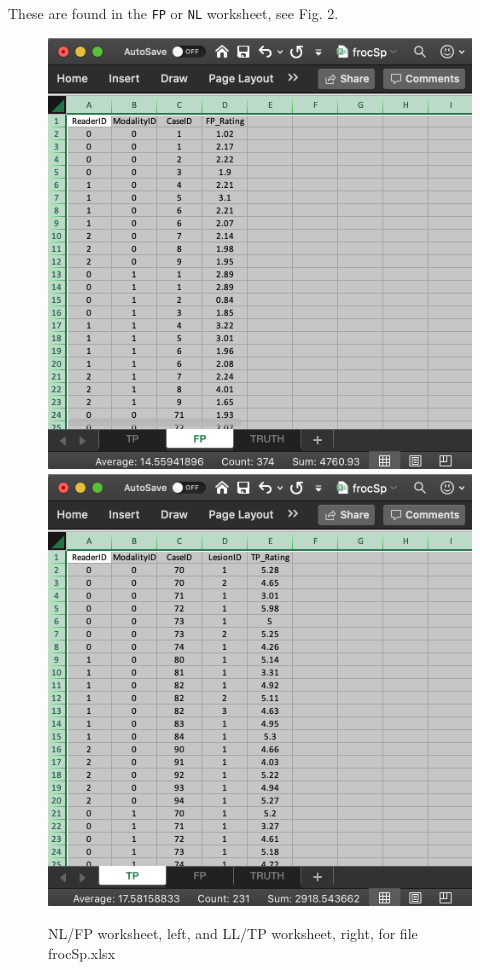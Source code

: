 \documentclass[]{book}
\begin{document}
These are found in the \texttt{FP} or \texttt{NL} worksheet, see Fig. 2.

\begin{figure}

{\centering \includegraphics[width=0.5\linewidth,height=0.2\textheight]{images/frocSpNL} \includegraphics[width=0.5\linewidth,height=0.2\textheight]{images/frocSpLL} 

}

\caption{NL/FP worksheet, left, and LL/TP worksheet, right, for file frocSp.xlsx}\label{fig:frocSpLL}
\end{figure}
\end{document}
